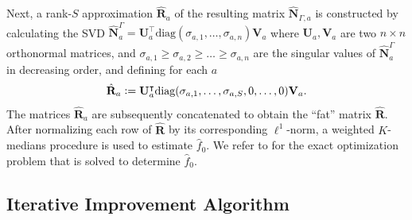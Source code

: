 \documentclass[11pt]{article}
\newcommand{\eqdef}{\vcentcolon=}
\newcommand{\mbf}[1]{\mathbf{#1}}
\theoremstyle{definition}
\theoremstyle{definition}
\begin{document}
Next, a rank-$S$ approximation $\hat{\mbf{R}}_a$ of the resulting matrix $\hat{\mbf{N}}_{\Gamma,a}$ is constructed by calculating the \gls{SVD} $\hat{\mbf{N}}^{\Gamma}_{a}=\mbf{U}_a^\intercal\text{diag}(\sigma_{a,1},\ldots,\sigma_{a,n})\mbf{V}_a$ where $\mbf{U}_a,\mbf{V}_a$ are two $n\times n$ orthonormal matrices, and $\sigma_{a,1}\geq \sigma_{a,2}\geq\ldots\geq\sigma_{a,n}$ are the singular values of $\hat{\mbf{N}}^{\Gamma}_{a}$ in decreasing order, and defining for each $a$
\begin{equation}\label{eqn:srankdef}
    \hat{\mbf{R}}_{a}
    \eqdef
    \mbf{U}_a^\intercal\text{diag}(\sigma_{a,1},\ldots,\sigma_{a,S},0,\ldots,0)\mbf{V}_a.
\end{equation}
The matrices $\hat{\mbf{R}}_{a}$ are subsequently concatenated to obtain the ``fat'' matrix $\hat{\mathbf{R}}$.
After normalizing each row of $\hat{\mathbf{R}}$ by its corresponding $\ell^1$-norm, a weighted $K$-medians procedure is used to estimate $\hat{f}_0$.
We refer to \cite[Eqn. (61)]{Jedra:2022} for the exact optimization problem that is solved to determine $\hat{f}_0$.

\subsection{Iterative Improvement Algorithm}
\label{sec:clusteringalgcia}
\end{document}
